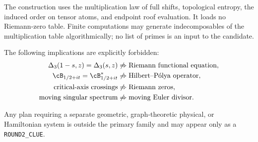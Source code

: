 The construction uses the multiplication law of full shifts, topological
entropy, the induced order on tensor atoms, and endpoint roof evaluation.
It loads no Riemann-zero table.  Finite computations may generate
indecomposables of the multiplication table algorithmically; no list of
primes is an input to the candidate.

The following implications are explicitly forbidden:
\begin{align*}
 \Delta_3(1-s,z)=\Delta_3(s,z)
   &\not\Rightarrow \text{Riemann functional equation},\\
 \cB_{1/2+it}=\cB_{1/2+it}^*
   &\not\Rightarrow \text{Hilbert--P\'olya operator},\\
 \text{critical-axis crossings}
   &\not\Rightarrow \text{Riemann zeros},\\
 \text{moving singular spectrum}
   &\not\Rightarrow \text{moving Euler divisor}.
\end{align*}

Any plan requiring a separate geometric, graph-theoretic physical, or
Hamiltonian system is outside the primary family and may appear only as a
\texttt{ROUND2\_CLUE}.
